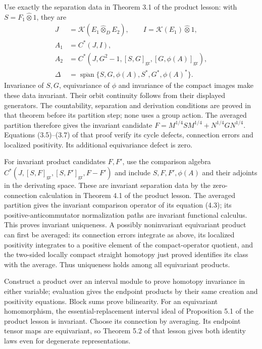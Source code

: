 \documentclass[
  11pt,
]{article}
\begin{document}
Use exactly the separation data in Theorem 3.1 of the product lesson:
with \(S=F_1\widehat\otimes1\), they are \[
\begin{aligned}
J&=\mathcal K(E_1\widehat\otimes_D E_2),\qquad
I=\mathcal K(E_1)\widehat\otimes1,\\
A_1&=C^*(J,I),\\
A_2&=C^*(J,G^2-1,[S,G]_{\mathrm{gr}},
 [G,\phi(A)]_{\mathrm{gr}}),\\
\Delta&=\overline{\operatorname{span}}
 \{S,G,\phi(A),S^*,G^*,\phi(A)^*\}.
\end{aligned}
\] Invariance of \(S,G\), equivariance of \(\phi\) and invariance of the
compact images make these data invariant. Their orbit continuity follows
from their displayed generators. The countability, separation and
derivation conditions are proved in that theorem before its partition
step; none uses a group action. The averaged partition therefore gives
the invariant candidate \(F=M^{1/4}SM^{1/4}+N^{1/4}GN^{1/4}\). Equations
(3.5)--(3.7) of that proof verify its cycle defects, connection errors
and localized positivity. Its additional equivariance defect is zero.

For invariant product candidates \(F,F'\), use the comparison algebra
\(C^*(J,[S,F]_{\mathrm{gr}},[S,F']_{\mathrm{gr}},F-F')\) and include
\(S,F,F',\phi(A)\) and their adjoints in the derivating space. These are
invariant separation data by the zero-connection calculation in Theorem
4.1 of the product lesson. The averaged partition gives the invariant
comparison operator of its equation (4.3); its positive-anticommutator
normalization paths are invariant functional calculus. This proves
invariant uniqueness. A possibly noninvariant equivariant product can
first be averaged: its connection errors integrate as above, its
localized positivity integrates to a positive element of the
compact-operator quotient, and the two-sided locally compact straight
homotopy just proved identifies its class with the average. Thus
uniqueness holds among all equivariant products.

Construct a product over an interval module to prove homotopy invariance
in either variable; evaluation gives the endpoint products by their same
creation and positivity equations. Block sums prove bilinearity. For an
equivariant homomorphism, the essential-replacement interval ideal of
Proposition 5.1 of the product lesson is invariant. Choose its
connection by averaging. Its endpoint tensor maps are equivariant, so
Theorem 5.2 of that lesson gives both identity laws even for degenerate
representations.
\end{document}
